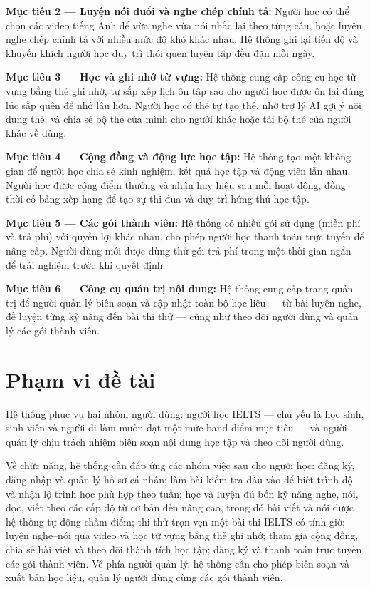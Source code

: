 \textbf{Mục tiêu 2 --- Luyện nói đuổi và nghe chép chính tả:} Người học có thể chọn các video tiếng Anh để vừa nghe vừa nói nhắc lại theo từng câu, hoặc luyện nghe chép chính tả với nhiều mức độ khó khác nhau. Hệ thống ghi lại tiến độ và khuyến khích người học duy trì thói quen luyện tập đều đặn mỗi ngày.

\textbf{Mục tiêu 3 --- Học và ghi nhớ từ vựng:} Hệ thống cung cấp công cụ học từ vựng bằng thẻ ghi nhớ, tự sắp xếp lịch ôn tập sao cho người học được ôn lại đúng lúc sắp quên để nhớ lâu hơn. Người học có thể tự tạo thẻ, nhờ trợ lý AI gợi ý nội dung thẻ, và chia sẻ bộ thẻ của mình cho người khác hoặc tải bộ thẻ của người khác về dùng.

\textbf{Mục tiêu 4 --- Cộng đồng và động lực học tập:} Hệ thống tạo một không gian để người học chia sẻ kinh nghiệm, kết quả học tập và động viên lẫn nhau. Người học được cộng điểm thưởng và nhận huy hiệu sau mỗi hoạt động, đồng thời có bảng xếp hạng để tạo sự thi đua và duy trì hứng thú học tập.

\textbf{Mục tiêu 5 --- Các gói thành viên:} Hệ thống có nhiều gói sử dụng (miễn phí và trả phí) với quyền lợi khác nhau, cho phép người học thanh toán trực tuyến để nâng cấp. Người dùng mới được dùng thử gói trả phí trong một thời gian ngắn để trải nghiệm trước khi quyết định.

\textbf{Mục tiêu 6 --- Công cụ quản trị nội dung:} Hệ thống cung cấp trang quản trị để người quản lý biên soạn và cập nhật toàn bộ học liệu --- từ bài luyện nghe, đề luyện từng kỹ năng đến bài thi thử --- cũng như theo dõi người dùng và quản lý các gói thành viên.

\section{Phạm vi đề tài}

Hệ thống phục vụ hai nhóm người dùng: người học IELTS --- chủ yếu là học sinh, sinh viên và người đi làm muốn đạt một mức band điểm mục tiêu --- và người quản lý chịu trách nhiệm biên soạn nội dung học tập và theo dõi người dùng.

Về chức năng, hệ thống cần đáp ứng các nhóm việc sau cho người học: đăng ký, đăng nhập và quản lý hồ sơ cá nhân; làm bài kiểm tra đầu vào để biết trình độ và nhận lộ trình học phù hợp theo tuần; học và luyện đủ bốn kỹ năng nghe, nói, đọc, viết theo các cấp độ từ cơ bản đến nâng cao, trong đó bài viết và nói được hệ thống tự động chấm điểm; thi thử trọn vẹn một bài thi IELTS có tính giờ; luyện nghe--nói qua video và học từ vựng bằng thẻ ghi nhớ; tham gia cộng đồng, chia sẻ bài viết và theo dõi thành tích học tập; đăng ký và thanh toán trực tuyến các gói thành viên. Về phía người quản lý, hệ thống cần cho phép biên soạn và xuất bản học liệu, quản lý người dùng cùng các gói thành viên.

